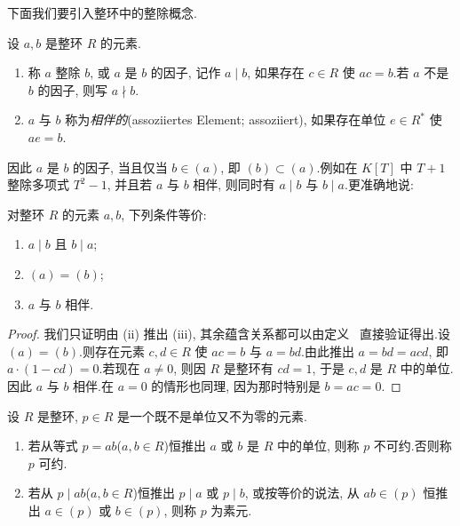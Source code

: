 下面我们要引入整环中的整除概念.

\begin{definition}\label{def:5.2.8}
设 $a, b$ 是整环 $R$ 的元素.
\begin{enumerate}
\item[(i)] 称 $a$ 整除 $b$, 或 $a$ 是 $b$ 的因子, 记作 $a \mid b$, 如果存在 $c \in R$ 使 $ac = b$.若 $a$ 不是 $b$ 的因子, 则写 $a \nmid b$.
\item[(ii)] $a$ 与 $b$ 称为\emph{相伴的}(\textup{assoziiertes Element; assoziiert}), 如果存在单位 $e \in R^*$ 使 $ae = b$.
\end{enumerate}
\end{definition}

因此 $a$ 是 $b$ 的因子, 当且仅当 $b \in (a)$, 即 $(b) \subset (a)$.例如在 $K[T]$ 中 $T + 1$ 整除多项式 $T^2 - 1$, 并且若 $a$ 与 $b$ 相伴, 则同时有 $a \mid b$ 与 $b \mid a$.更准确地说:

\begin{remark}\label{rem:5.2.9}
对整环 $R$ 的元素 $a, b$, 下列条件等价:
\begin{enumerate}
\item[(i)] $a \mid b$ 且 $b \mid a$;
\item[(ii)] $(a) = (b)$;
\item[(iii)] $a$ 与 $b$ 相伴.
\end{enumerate}
\end{remark}

\begin{proof}
我们只证明由 (ii) 推出 (iii), 其余蕴含关系都可以由定义~ 直接验证得出.设 $(a) = (b)$.则存在元素 $c, d \in R$ 使 $ac = b$ 与 $a = bd$.由此推出 $a = bd = acd$, 即 $a \cdot (1 - cd) = 0$.若现在 $a \neq 0$, 则因 $R$ 是整环有 $cd = 1$, 于是 $c, d$ 是 $R$ 中的单位.因此 $a$ 与 $b$ 相伴.在 $a = 0$ 的情形也同理, 因为那时特别是 $b = ac = 0$.
\end{proof}

\begin{definition}\label{def:5.2.10}
设 $R$ 是整环, $p \in R$ 是一个既不是单位又不为零的元素.
\begin{enumerate}
\item[(i)] 若从等式 $p = ab$($a, b \in R$)恒推出 $a$ 或 $b$ 是 $R$ 中的单位, 则称 $p$ 不可约.否则称 $p$ 可约.
\item[(ii)] 若从 $p \mid ab$($a, b \in R$)恒推出 $p \mid a$ 或 $p \mid b$, 或按等价的说法, 从 $ab \in (p)$ 恒推出 $a \in (p)$ 或 $b \in (p)$, 则称 $p$ 为素元.
\end{enumerate}
\end{definition}

